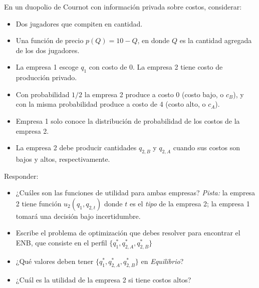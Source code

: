 \documentclass[12pt]{scrartcl} %
\begin{document}
\begin{Exercise}[name=Pregunta]

  En un duopolio de Cournot con información privada sobre costos, considerar:

  \begin{itemize}
    \item Dos jugadores que compiten en cantidad.
    \item Una función de precio $ p(Q)=10 - Q $, en donde $ Q $ es la cantidad agregada de los dos jugadores.
    \item La empresa 1 escoge $ q_1 $ con costo de 0. La empresa 2 tiene costo de producción privado. 
    \item Con probabilidad $ 1/2 $ la empresa 2 produce a costo 0 (costo bajo, o $ c_B $), y con la misma probabilidad produce a costo de 4 (costo alto, o $c_A$).
    \item Empresa 1 solo conoce la distribución de probabilidad de los costos de la empresa 2.
    \item La empresa 2 debe producir cantidades $ q_{2,B} $ y $ q_{2,A} $ cuando sus costos son bajos y altos, respectivamente. 
  \end{itemize}

  Responder:

 \begin{itemize}
   \setlength{\itemsep}{0pt}
   \setlength{\parskip}{0pt}
   \setlength{\parsep}{0pt}
   \item ¿Cuáles son las funciones de utilidad para ambas empresas? \textit{Pista:} la empresa 2 tiene función $ u_2(q_1, q_{2,t}) $ donde $ t $ es el \textit{tipo} de la empresa 2; la empresa 1 tomará una decisión bajo incertidumbre.
   \item Escribe el problema de optimización que debes resolver para encontrar el ENB, que consiste en el perfil $\{q_1^*, q_{2,A}^*, q_{2,B}^* \}$
   \item ¿Qué valores deben tener $\{q_1^*, q_{2,A}^*, q_{2,B}^* \}$ en \textit{Equilibrio}?
   \item ¿Cuál es la utilidad de la empresa 2 si tiene costos altos?
 \end{itemize}
  
\end{Exercise}
\end{document}
